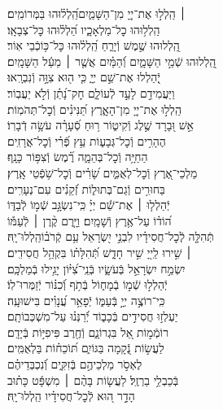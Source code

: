 \documentclass[twoside, openany, parskip=half, 11pt]{book}
\begin{document}
\begin{narrow}
 ׀ \hfill \break
הַֽלְל֣וּ אֶת־יְיָ֭ מִן־הַשָּׁמַ֑יִם\hfill הַֽ֝לְל֗וּהוּ בַּמְּרוֹמִֽים׃ \\
הַֽלְל֥וּהוּ כׇל־מַלְאָכָ֑יו \hfill הַ֝לְל֗וּהוּ כׇּל־צְבָאָֽו׃ \\
הַֽ֭לְלוּהוּ שֶׁ֣מֶשׁ וְֿיָרֵ֑חַ \hfill הַֽ֝לְל֗וּהוּ כׇּל־כּ֥וֹכְֿבֵי אֽוֹר׃ \\
הַֽ֭לְלוּהוּ שְֿׁמֵ֣י הַשָּׁמָ֑יִם \hfill וְֿ֝הַמַּ֗יִם אֲשֶׁ֤ר ׀ מֵעַ֬ל הַשָּׁמָֽיִם׃ \\
יְֽֿ֭הַלְלוּ אֶת־שֵׁ֣ם יְיָ֑ \hfill כִּ֤י ה֖וּא צִוָּ֣ה וְֿנִבְרָֽאוּ׃ \\
וַיַּעֲמִידֵ֣ם לָעַ֣ד לְֿעוֹלָ֑ם \hfill חׇק־נָ֝תַ֗ן וְֿלֹ֣א יַעֲבֽוֹר׃ \\
הַֽלְל֣וּ אֶת־יְיָ֭ מִן־הָאָ֑רֶץ \hfill תַּ֝נִּינִ֗ים וְֿכׇל־תְּהֹמֽוֹת׃ \\
אֵ֣שׁ וּ֭בָרָד שֶׁ֣לֶג וְֿקִיט֑וֹר \hfill ר֥וּחַ סְֿ֝עָרָ֗ה עֹשָׂ֥ה דְֿבָרֽוֹ׃ \\
הֶהָרִ֥ים וְֿכׇל־גְּבָע֑וֹת \hfill עֵ֥ץ פְּֿ֝רִ֗י וְֿכׇל־אֲרָזִֽים׃ \\
הַחַיָּ֥ה וְֿכׇל־בְּהֵמָ֑ה \hfill רֶ֗֝מֶשׂ וְֿצִפּ֥וֹר כָּנָֽף׃ \\
מַלְכֵי־אֶ֭רֶץ וְֿכׇל־לְאֻמִּ֑ים \hfill שָׂ֝רִ֗ים וְֿכׇל־שֹׁ֥פְֿטֵי אָֽרֶץ׃ \\
בַּחוּרִ֥ים וְֿגַם־בְּתוּל֑וֹת \hfill זְֿ֝קֵנִ֗ים עִם־נְעָרִֽים׃ \\
יְֿהַלְל֤וּ ׀ אֶת־שֵׁ֬ם יְיָ֗ \hfill כִּֽי־נִשְׂגָּ֣ב שְֿׁמ֣וֹ לְֿבַדּ֑וֹ\\ ה֝וֹד֗וֹ עַל־אֶ֥רֶץ וְֿשָׁמָֽיִם׃ \hfill
וַיָּ֤רֶם קֶ֨רֶן ׀ לְֿעַמּ֡וֹ\\ תְּֿהִלָּ֤ה לְֽֿכׇל־חֲסִידָ֗יו לִבְנֵ֣י יִ֭שְׂרָאֵל עַ֥ם קְֿרֹב֗וֹ\hfill הַֽלְלוּ־יָֽהּ׃ \\


 ׀ \hfill \break
שִׁ֣ירוּ לַֽייָ֭ שִׁ֣יר חָדָ֑שׁ \hfill תְּֿ֝הִלָּת֗וֹ בִּקְהַ֥ל חֲסִידִֽים׃ \\
יִשְׂמַ֣ח יִשְׂרָאֵ֣ל בְּֿעֹשָׂ֑יו \hfill בְּֿנֵֽי־צִ֝יּ֗וֹן יָגִ֥ילוּ בְֿמַלְכָּֽם׃ \\
יְֿהַלְל֣וּ שְֿׁמ֣וֹ בְֿמָח֑וֹל \hfill בְּֿתֹ֥ף וְֿ֝כִנּ֗וֹר יְֿזַמְּרוּ־לֽוֹ׃ \\
כִּֽי־רוֹצֶ֣ה יְיָ֣ בְּֿעַמּ֑וֹ \hfill יְֿפָאֵ֥ר עֲ֝נָוִ֗ים בִּישׁוּעָֽה׃ \\
יַעְלְז֣וּ חֲסִידִ֣ים בְּֿכָב֑וֹד \hfill יְֿ֝רַנְּנ֗וּ עַל־מִשְׁכְּבוֹתָֽם׃ \\
רוֹמְֿמ֣וֹת אֵ֭ל בִּגְרוֹנָ֑ם \hfill וְֿחֶ֖רֶב פִּיפִיּ֣וֹת בְּֿיָדָֽם׃ \\
לַעֲשׂ֣וֹת נְֿ֭קָמָה בַּגּוֹיִ֑ם \hfill תּ֝וֹכֵח֗וֹת בַּלְאֻמִּֽים׃ \\
לֶאְסֹ֣ר מַלְכֵיהֶ֣ם בְּֿזִקִּ֑ים \hfill וְֿ֝נִכְבְּדֵיהֶ֗ם\\ בְּֿכַבְלֵ֥י בַרְזֶֽל׃ \hfill
לַעֲשׂ֤וֹת בָּהֶ֨ם ׀ מִשְׁפָּ֬ט כָּת֗וּב\\ הָדָ֣ר ה֭וּא לְֿכׇל־חֲסִידָ֗יו \hfill הַֽלְלוּ־יָֽהּ׃ \\



\end{narrow}
\end{document}
